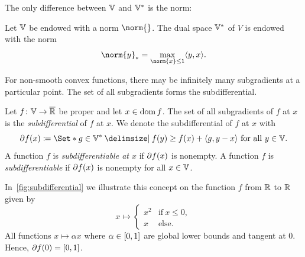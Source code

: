The only difference between \( \mathbb{V} \) and \( \mathbb{V}^{\ast} \) is the norm:
\begin{definition}%
	\label{def:dual norm}
	Let \( \mathbb{V} \) be endowed with a norm \( \norm{} \).
	The dual space \( \mathbb{V}^{\ast} \) of \( V \) is endowed with the norm
	\begin{equation}
		\norm{y}_{*} = \max_{\norm{x} \leq 1} \inprod{y}{x}.
	\end{equation}
\end{definition}
For non-smooth convex functions, there may be infinitely many subgradients at a particular point.
The set of all subgradients forms the subdifferential.
\begin{definition}[Subdifferential]%
	\label{def:subdifferential}
	Let \( f \colon \mathbb{V} \to \overline{\mathbb{R}} \) be proper and let \( x \in \operatorname{dom} f \).
	The set of all subgradients of \( f \) at \( x \) is the \emph{subdifferential} of \( f \) at \( x \).
	We denote the subdifferential of \( f \) at \( x \) with
	\[
		\Subdifferential f (x) \coloneqq \Set*{g \in \DualSpace{\V} \given f(y) \geq f(x) + \inprod{g}{y - x} \text{ for all } y \in \V}.
	\]
	A function \( f \) is \emph{subdifferentiable at \( x \)} if \( \partial f(x) \) is nonempty.
	A function \( f \) is \emph{subdifferentiable} if \( \partial f(x) \) is nonempty for all \( x \in \mathbb{V} \).
\end{definition}
In~\cref{fig:subdifferential} we illustrate this concept on the function \( f \) from \( \mathbb{R} \) to \( \mathbb{R} \) given by
\begin{equation}
	x \mapsto \begin{cases}
		x^{\num{2}} & \text{if}\ x \leq \num{0}, \\
		x & \text{else}.
	\end{cases}
	\label{eq:subdifferential example}
\end{equation}
All functions \( x \mapsto \alpha x \) where \( \alpha \in \interval{\num{0}}{\num{1}} \) are global lower bounds and tangent at \( \num{0} \).
Hence, \( \Subdifferential f(\num{0}) = \interval{\num{0}}{\num{1}} \).
\begin{sidefigure}
	\caption[Illustration of the subdifferential]{%
		Illustration of the subdifferential.
		All black dashed functions are global lower bounds of and tangent to the green function at zero.
		The shaded area is the span of all such functions.
	}%
	\label{fig:subdifferential}
\end{sidefigure}

